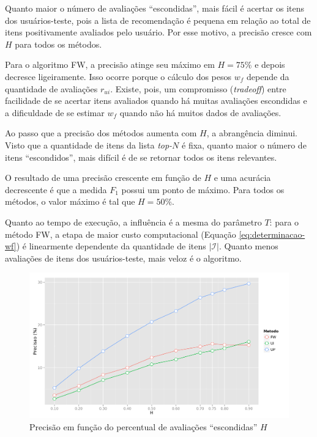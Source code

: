 Quanto maior o número de avaliações ``escondidas'', mais fácil é acertar os itens dos usuários-teste, pois a lista de recomendação é pequena em relação ao total de itens positivamente avaliados pelo usuário. Por esse motivo, a precisão cresce com $H$ para todos os métodos. 

Para o algoritmo FW, a precisão atinge seu máximo em $H=75\%$ e depois decresce ligeiramente. Isso ocorre porque o cálculo dos pesos $w_f$ depende da quantidade de avaliações $r_{ui}$. Existe, pois, um compromisso (\textit{tradeoff}) entre facilidade de se acertar itens avaliados quando há muitas avaliações escondidas e a dificuldade de se estimar $w_f$ quando não há muitos dados de avaliações.  

Ao passo que a precisão dos métodos aumenta com $H$, a abrangência diminui. Visto que a quantidade de itens da lista \textit{top-}$N$ é fixa, quanto maior o número de itens ``escondidos'', mais difícil é de se retornar todos os itens relevantes.

O resultado de uma precisão crescente em função de $H$ e uma acurácia decrescente é que a medida $F_1$ possui um ponto de máximo. Para todos os métodos, o valor máximo é tal que $H=50\%$.

Quanto ao tempo de execução, a influência é a mesma do parâmetro $T$: 
para o método FW, a etapa de maior custo computacional (Equação \ref{eq:determinacao-wf}) é linearmente dependente da quantidade de itens $\left|\mathcal{I}\right|$. Quanto menos avaliações de itens dos usuários-teste, mais veloz é o algoritmo.


\begin{figure}[htp]
    \begin{center}
    \includegraphics[width=1\textwidth]{img/precision_H}
    \end{center}
    \label{fig:precision_H}
    \caption{Precisão em função do percentual de avaliações ``escondidas'' $H$}
\end{figure}


